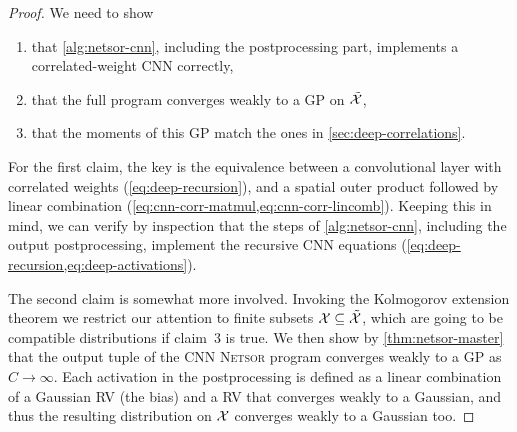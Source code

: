 \documentclass[accepted]{uai2021} %
\newcommand{\Netsor}{\textsc{Netsor}\xspace}
\newcommand{\0}{\boldsymbol{0}}
\newcommand{\1}{\boldsymbol{1}}
\newcommand{\crefp}[1]{(\cref{#1})}
\newcommand{\eqparref}{\crefp}
\newcommand{\eqparreftwo}[2]{\crefp{#1,#2}}
\begin{document}
\begin{proof}
  We need to show
  \begin{enumerate}
    \item that \cref{alg:netsor-cnn}, including the postprocessing part, implements a correlated-weight CNN correctly,
    \item that the full program converges weakly to a \ac{GP} on $\tilde{{\mathcal{X}}}$,
    \item that the moments of this \ac{GP} match the ones in \cref{sec:deep-correlations}.
  \end{enumerate}

  For the first claim, the key is the equivalence between a convolutional layer
  with correlated weights \eqparref{eq:deep-recursion}, and a spatial outer
  product followed by linear combination
  \eqparreftwo{eq:cnn-corr-matmul}{eq:cnn-corr-lincomb}. Keeping this in mind, we
  can verify by inspection that the steps of \cref{alg:netsor-cnn}, including
  the output postprocessing, implement the recursive CNN equations
  \crefp{eq:deep-recursion,eq:deep-activations}.

  The second claim is somewhat more involved. Invoking the Kolmogorov extension
  theorem \citep[Thm.~2.4.3]{measure-theory-intro} we restrict our attention to finite
  subsets ${\mathcal{X}} \subseteq \tilde{{\mathcal{X}}}$, which are going to be compatible
  distributions if claim~3 is true.
  We then show by \cref{thm:netsor-master} that the output tuple of the CNN
  \Netsor program converges weakly to a GP as $C\to\infty$. Each activation in
  the postprocessing is defined as a linear combination of a Gaussian \ac{RV}
  (the bias) and a \ac{RV} that converges weakly to a Gaussian, and thus the resulting distribution on ${\mathcal{X}}$ converges weakly to a Gaussian too.


\end{proof}
\end{document}

